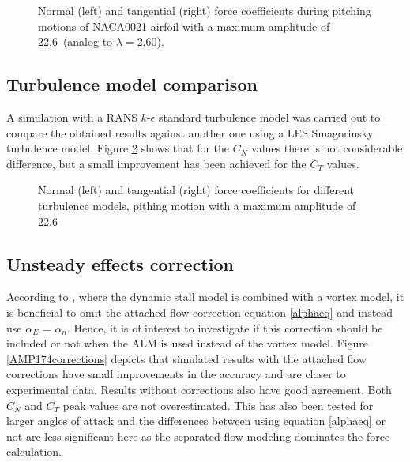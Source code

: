 \documentclass[a4paper]{jpconf}
\begin{document}
\begin{figure}[h]
\begin{minipage}{18pc}
\resizebox{\columnwidth}{!}{}
\end{minipage}\hspace{2pc}%
\begin{minipage}{18pc}
\resizebox{\columnwidth}{!}{}
\end{minipage}
\caption{\label{fig226}Normal (left) and tangential (right) force coefficients during pitching motions of NACA0021 airfoil with a maximum amplitude of 22.6\degree\ (analog to $\lambda = 2.60$).}
\end{figure}

\subsection{Turbulence model comparison}
A simulation with a RANS $k$-$\epsilon$ standard turbulence model was carried out to compare the obtained results against another one using a LES Smagorinsky turbulence model. Figure \ref{RANSLES} shows that for the $C_N$ values there is not considerable difference, but a small improvement has been achieved for the $C_T$ values.

\begin{figure}[h]
\begin{minipage}{18pc}
\resizebox{\columnwidth}{!}{}
\end{minipage}\hspace{2pc}%
\begin{minipage}{18pc}
\resizebox{\columnwidth}{!}{}
\end{minipage}
\caption{\label{RANSLES}Normal (left) and tangential (right) force coefficients for different turbulence models, pithing motion with a maximum amplitude of 22.6\degree\ }
\end{figure}

\subsection{Unsteady effects correction}


According to \cite{dyachuk2015simulating}, where the dynamic stall model is combined with a vortex model, it is beneficial to omit the attached flow correction equation \ref{alphaeq} and instead use $\alpha_E$ = $\alpha_n$. Hence, it is of interest to investigate if this correction should be included or not when the ALM is used instead of the vortex model. Figure \ref{AMP174corrections} depicts that simulated results with the attached flow corrections have small improvements in the accuracy and are closer to experimental data. Results without corrections also have good agreement. Both $C_N$ and $C_T$ peak values are not overestimated. This has also been tested for larger angles of attack and the differences between using equation \ref{alphaeq} or not are less significant here as the separated flow modeling dominates the force calculation.  
\end{document}
